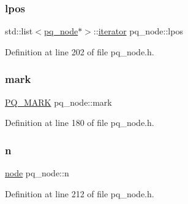 \mbox{\label{classpq__node_a71cc9bb3c11aac468ff77d64643c38dc}} 
\subsubsection{\texorpdfstring{lpos}{lpos}}
{\footnotesize\ttfamily std\+::list$<$\mbox{\hyperlink{classpq__node}{pq\+\_\+node}}$\ast$$>$\+::\mbox{\hyperlink{classpq__node_a34898c9eb1527787c07e8ebefd6bfba5}{iterator}} pq\+\_\+node\+::lpos\hspace{0.3cm}{\ttfamily [protected]}}



Definition at line 202 of file pq\+\_\+node.\+h.

\mbox{\label{classpq__node_aee913582a7b268ce2570bee8a8367c50}} 
\subsubsection{\texorpdfstring{mark}{mark}}
{\footnotesize\ttfamily \mbox{\hyperlink{classpq__node_a6236b20cd5f6cc02cb5f637ed34c96d9}{P\+Q\+\_\+\+M\+A\+RK}} pq\+\_\+node\+::mark\hspace{0.3cm}{\ttfamily [protected]}}



Definition at line 180 of file pq\+\_\+node.\+h.

\mbox{\label{classpq__node_a4997fd09a95d9a659b99cea04197740a}} 
\subsubsection{\texorpdfstring{n}{n}}
{\footnotesize\ttfamily \mbox{\hyperlink{classnode}{node}} pq\+\_\+node\+::n\hspace{0.3cm}{\ttfamily [protected]}}



Definition at line 212 of file pq\+\_\+node.\+h.

\mbox{\label{classpq__node_a8d8fb7b3059e7aeecf62eeed34076afb}} 
